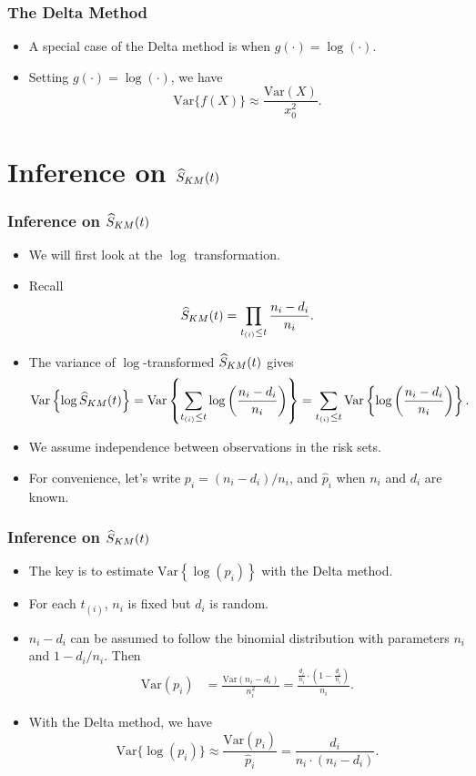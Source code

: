 \documentclass[10pt]{beamer}\usepackage[]{graphicx}\usepackage[]{color}
\newcommand{\Var}{\mathrm{Var}}
\newcommand{\E}{\mathrm{E}}
\newcommand{\Skm}{\widehat{S}_{\scriptsize{KM}}}
\begin{document}
\begin{frame}
  \frametitle{The Delta Method}
  \begin{itemize}
    \item A special case of the Delta method is when $g(\cdot) = \log(\cdot)$.
    \item Setting $g(\cdot) = \log(\cdot)$, we have
      $$ \Var\{f(X)\}\approx \frac{\Var(X)}{x_0^2}.$$
  \end{itemize}
\end{frame}

\section{Inference on $\Skm(t)$}
\begin{frame}
  \frametitle{Inference on $\Skm(t)$}
  \begin{itemize}
    \item We will first look at the $\log$ transformation.
    \item Recall $$\Skm(t) = \prod_{t_{(i)}\le t}\frac{n_i - d_i}{n_i}.$$
    \item The variance of $\log$-transformed $\Skm(t)$ gives
       $$\Var\left\{\log\Skm(t)\right\} = \Var\left\{\sum_{t_{(i)}\le t}\log\left(\frac{n_i - d_i}{n_i}\right)\right\} = 
       \sum_{t_{(i)}\le t}\Var\left\{\log\left(\frac{n_i - d_i}{n_i}\right)\right\}.$$
     \item We assume independence between observations in the risk sets.
     \item For convenience, let's write $p_i = (n_i - d_i) / n_i$, and $\hat p_i$ when $n_i$ and $d_i$ are known.
  \end{itemize}
\end{frame}


\begin{frame}
  \frametitle{Inference on $\Skm(t)$}
  \begin{itemize}
  \item The key is to estimate $\Var\left\{\log\left(p_i\right)\right\}$ with the Delta method.
  \item For each $t_{(i)}$, $n_i$ is fixed but $d_i$ is random. 
  \item $n_i - d_i$ can be assumed to follow the binomial distribution with parameters $n_i$ and $1 - d_i / n_i$.
    Then
    \begin{align*}
      \Var(p_i) &= \frac{\Var(n_i - d_i)}{n_i^2} = \frac{\frac{d_i}{n_i}\cdot\left(1 - \frac{d_i}{n_i}\right)}{n_i}.
    \end{align*}
  \item With the Delta method, we have
    $$ \Var\{\log(p_i)\} \approx \frac{\Var(p_i)}{\hat p_i} = \frac{d_i}{n_i\cdot(n_i-d_i)}. $$
  \end{itemize}
\end{frame}
\end{document}
